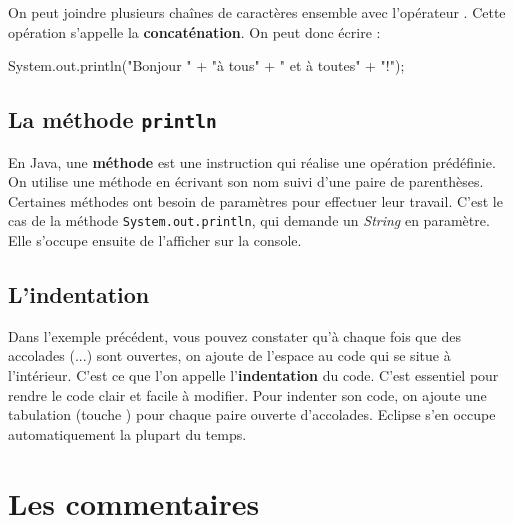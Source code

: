 \documentclass[12pt]{report}
\newcommand{\commande}[1]{%
\tcbox[on line, size=fbox, colframe=black, boxrule=0.75pt, tcbox raise base]{#1} %
}
\begin{document}
On peut joindre plusieurs chaînes de caractères ensemble avec l'opérateur \commande{+}. Cette opération s'appelle la \textbf{concaténation}. On peut donc écrire :%
\begin{code}
System.out.println("Bonjour " + "à tous" + " et à toutes" + "!");
\end{code} 





%
\subsection{La méthode \texttt{println}}
%
En Java, une \textbf{méthode} est une instruction qui réalise une opération prédéfinie. On utilise une méthode en écrivant son nom suivi d'une paire de parenthèses. Certaines méthodes ont besoin de paramètres pour effectuer leur travail. C'est le cas de la méthode \texttt{System.out.println}, qui demande un \emph{String} en paramètre. Elle s'occupe ensuite de l'afficher sur la console.




%
\subsection{L'indentation}
%
Dans l'exemple précédent, vous pouvez constater qu'à chaque fois que des accolades ({...}) sont ouvertes, on ajoute de l'espace au code qui se situe à l'intérieur. C'est ce que l'on appelle l'\textbf{indentation} du code. C'est essentiel pour rendre le code clair et facile à modifier. Pour indenter son code, on ajoute une tabulation (touche \commande{Tab $\rightleftarrows$}) pour chaque paire ouverte d'accolades. Eclipse s'en occupe automatiquement la plupart du temps.







%
\section{Les commentaires}
%
%
%
\end{document}
